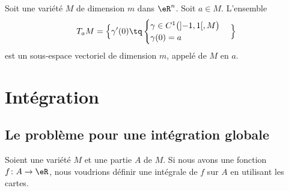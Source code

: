 \begin{propositionDef}		\label{DEFooMCEYooHuCAdg}
	Soit une variété \( M\) de dimension \( m\) dans \( \eR^n\). Soit \( a\in M\). L'ensemble
	\begin{equation}
		T_aM=\Big\{ \gamma'(0)\tq \begin{cases}
			\gamma\in C^1\big(\mathopen] -1,1\mathclose[,M\big) \\
			\gamma(0)=a
		\end{cases}\Big\}
	\end{equation}
	est un sous-espace vectoriel de dimension \( m\), appelé  de \( M\) en \( a\).
\end{propositionDef}

\ssdem

\section{Intégration}

\subsection{Le problème pour une intégration globale}

Soient une variété \( M\) et une partie \( A\) de \( M\). Si nous avons une fonction \( f\colon A\to \eR\), nous voudrions définir une intégrale de \( f\) sur \( A\) en utilisant les cartes.

